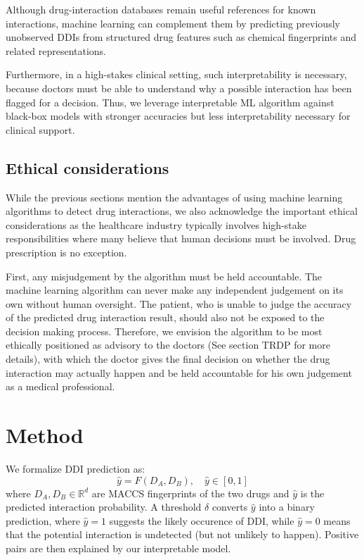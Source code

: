 \documentclass[letterpaper]{article} %
\begin{document}
Although drug-interaction databases remain useful references for known interactions, machine learning can complement them by predicting previously unobserved DDIs from structured drug features such as chemical fingerprints and related representations. 

Furthermore, in a high-stakes clinical setting, such interpretability is necessary, because doctors must be able to understand why a possible interaction has been flagged for a decision. Thus, we leverage interpretable ML algorithm against black-box models with stronger accuracies but less interpretability necessary for clinical support.



\subsection{Ethical considerations}

While the previous sections mention the advantages of using machine learning algorithms to detect drug interactions, we also acknowledge the important ethical considerations as the healthcare industry typically involves high-stake responsibilities where many believe that human decisions must be involved. Drug prescription is no exception. 

First, any misjudgement by the algorithm must be held accountable. The machine learning algorithm can never make any independent judgement on its own without human oversight. The patient, who is unable to judge the accuracy of the predicted drug interaction result, should also not be exposed to the decision making process. Therefore, we envision the algorithm to be most ethically positioned as advisory to the doctors (See section TRDP for more details), with which the doctor gives the final decision on whether the drug interaction may actually happen and be held accountable for his own judgement as a medical professional.

\section{Method}

We formalize DDI prediction as:
\begin{equation}
    \hat{y} = F(D_A, D_B), \quad \hat{y} \in [0, 1]
\end{equation}
where $D_A, D_B \in \mathbb{R}^{d}$ are MACCS fingerprints of the two drugs and $\hat{y}$ is the predicted interaction probability. A threshold $\delta$ converts $\hat{y}$ into a binary prediction, where $\hat{y} = 1$ suggests the likely occurence of DDI, while $\hat{y} = 0$ means that the potential interaction is undetected (but not unlikely to happen). Positive pairs are then explained by our interpretable model.
\end{document}
